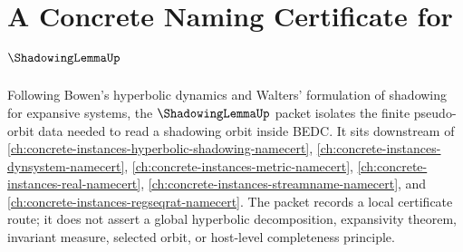 \chapter{A Concrete Naming Certificate for $\ShadowingLemmaUp$}
\label{ch:concrete-instances-shadowing-lemma-namecert}

Following Bowen's hyperbolic dynamics and Walters' formulation of shadowing for expansive systems, the $\ShadowingLemmaUp$ packet isolates the finite pseudo-orbit data needed to read a shadowing orbit inside BEDC. It sits downstream of \autoref{ch:concrete-instances-hyperbolic-shadowing-namecert}, \autoref{ch:concrete-instances-dynsystem-namecert}, \autoref{ch:concrete-instances-metric-namecert}, \autoref{ch:concrete-instances-real-namecert}, \autoref{ch:concrete-instances-streamname-namecert}, and \autoref{ch:concrete-instances-regseqrat-namecert}. The packet records a local certificate route; it does not assert a global hyperbolic decomposition, expansivity theorem, invariant measure, selected orbit, or host-level completeness principle.


